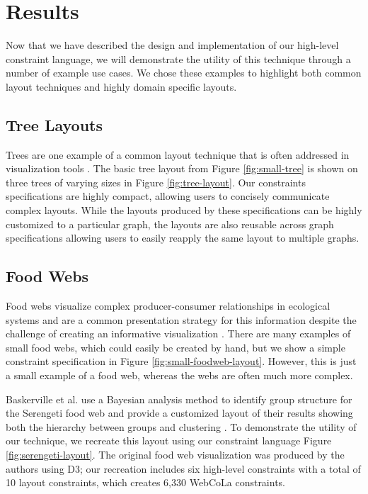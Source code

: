 \section{Results}
Now that we have described the design and implementation of our high-level constraint language, we will demonstrate the utility of this technique through a number of example use cases. We chose these examples to highlight both common layout techniques and highly domain specific layouts.

\subsection{Tree Layouts}
\treeLayout
\serengetiLayout
Trees are one example of a common layout technique that is often addressed in visualization tools \cite{bostock:d3,WebCoLa,ellson2001graphviz,bastian2009gephi}. The basic tree layout from Figure \ref{fig:small-tree} is shown on three trees of varying sizes in Figure \ref{fig:tree-layout}. Our constraints specifications are highly compact, allowing users to concisely communicate complex layouts. While the layouts produced by these specifications can be highly customized to a particular graph, the layouts are also reusable across graph specifications allowing users to easily reapply the same layout to multiple graphs.

\subsection{Food Webs}
\smallFoodWebLayout
Food webs visualize complex producer-consumer relationships in ecological systems and are a common presentation strategy for this information despite the challenge of creating an informative visualization \cite{baskerville2011spatial,lavigne1996cod,yodzis1998local,cohen2003ecological,kearney2016blog,benson2016higher}. There are many examples of small food webs, which could easily be created by hand, but we show a simple constraint specification in Figure \ref{fig:small-foodweb-layout}. However, this is just a small example of a food web, whereas the webs are often much more complex.

Baskerville et al. use a Bayesian analysis method to identify group structure for the Serengeti food web and provide a customized layout of their results showing both the hierarchy between groups and clustering \cite{baskerville2011spatial}. To demonstrate the utility of our technique, we recreate this layout using our constraint language Figure \ref{fig:serengeti-layout}. The original food web visualization was produced by the authors using D3; our recreation includes six high-level constraints with a total of 10 layout constraints, which creates 6,330 WebCoLa constraints.

